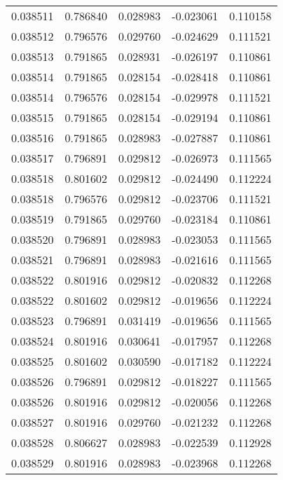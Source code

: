 \begin{tabular}{lrrrr}
0.038511    &  0.786840 &  0.028983 & -0.023061 &             0.110158 \\
0.038512    &  0.796576 &  0.029760 & -0.024629 &             0.111521 \\
0.038513    &  0.791865 &  0.028931 & -0.026197 &             0.110861 \\
0.038514    &  0.791865 &  0.028154 & -0.028418 &             0.110861 \\
0.038514    &  0.796576 &  0.028154 & -0.029978 &             0.111521 \\
0.038515    &  0.791865 &  0.028154 & -0.029194 &             0.110861 \\
0.038516    &  0.791865 &  0.028983 & -0.027887 &             0.110861 \\
0.038517    &  0.796891 &  0.029812 & -0.026973 &             0.111565 \\
0.038518    &  0.801602 &  0.029812 & -0.024490 &             0.112224 \\
0.038518    &  0.796576 &  0.029812 & -0.023706 &             0.111521 \\
0.038519    &  0.791865 &  0.029760 & -0.023184 &             0.110861 \\
0.038520    &  0.796891 &  0.028983 & -0.023053 &             0.111565 \\
0.038521    &  0.796891 &  0.028983 & -0.021616 &             0.111565 \\
0.038522    &  0.801916 &  0.029812 & -0.020832 &             0.112268 \\
0.038522    &  0.801602 &  0.029812 & -0.019656 &             0.112224 \\
0.038523    &  0.796891 &  0.031419 & -0.019656 &             0.111565 \\
0.038524    &  0.801916 &  0.030641 & -0.017957 &             0.112268 \\
0.038525    &  0.801602 &  0.030590 & -0.017182 &             0.112224 \\
0.038526    &  0.796891 &  0.029812 & -0.018227 &             0.111565 \\
0.038526    &  0.801916 &  0.029812 & -0.020056 &             0.112268 \\
0.038527    &  0.801916 &  0.029760 & -0.021232 &             0.112268 \\
0.038528    &  0.806627 &  0.028983 & -0.022539 &             0.112928 \\
0.038529    &  0.801916 &  0.028983 & -0.023968 &             0.112268 \\

\end{tabular}
